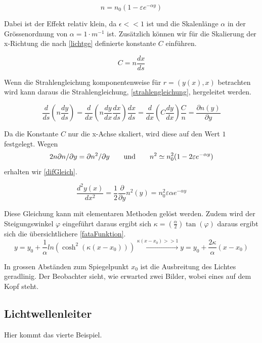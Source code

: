 \begin{equation}
	n = n_0 (1 - \varepsilon e^{- \alpha y})
	\label{brechungsindexFunktion}
\end{equation}

Dabei ist der Effekt relativ klein, da $\epsilon << 1$ ist und 
die Skalenlänge $\alpha$ in der Grössenordnung von $\alpha = 1 \cdot m^{-1}$ ist.
Zusätzlich können wir für die Skalierung der x-Richtung die nach \eqref{lichtge} definierte konstante $C$ einführen.

\begin{equation}
	C = n \frac{dx}{ds}
	\label{lichtge}
\end{equation}

Wenn die Strahlengleichung komponentenweise für $r = (y(x), x)$ betrachten wird kann daraus die Strahlengleichung, \eqref{strahlengleichung}, hergeleitet werden.

\begin{equation}
\frac{d}{ds} \left ( n \frac{dy}{ds} \right ) = \frac{d}{dx} \left ( n \frac{dy}{dx} \frac{dx}{ds} \right ) \frac{dx}{ds} =
\frac{d}{dx} \left ( C \frac{dy}{dx} \right ) \frac{C}{n} = \frac{\partial n(y)}{\partial y}
\label{strahlengleichung}
\end{equation}

Da die Konstante $C$ nur die x-Achse skaliert, wird diese auf den Wert $1$ festgelegt.
Wegen 
\begin{equation}
	2 n \partial n / \partial y = \partial n^2 / \partial y \qquad \text{und} \qquad n^2 \simeq n_0^2(1 - 2 \varepsilon e^{-\alpha y}) \notag
\end{equation}erhalten wir \eqref{difGleich}.

\begin{equation}
	\frac{d^2 y(x)}{dx^2} = \frac{1}{2} \frac{\partial}{\partial y} n^2(y) = n_0^2 \varepsilon \alpha e^{-\alpha y}
	\label{difGleich}
\end{equation}

Diese Gleichung kann mit elementaren Methoden gelöst werden. 
Zudem wird der Steigungswinkel $\varphi$ eingeführt daraus ergibt sich
$\kappa = (\frac{\alpha}{2}) \tan(\varphi)$ daraus ergibt sich die übersichtlichere \eqref{fataFunktion}.
\begin{equation}
	y = y_0 + \frac{1}{\alpha} ln(\cosh^2(\kappa(x - x_0))) \xrightarrow{\kappa (x - x_0 ) >> 1} y =	y_0 + \frac{2 \kappa}{\alpha} (x - x_0)
	\label{fataFunktion}
\end{equation}


In grossen Abständen zum Spiegelpunkt $x_0$ ist die Ausbreitung des Lichtes geradlinig.
Der Beobachter sieht, wie erwarted zwei Bilder, wobei eines auf dem Kopf steht.

\subsection{Lichtwellenleiter}

Hier kommt das vierte Beispiel.